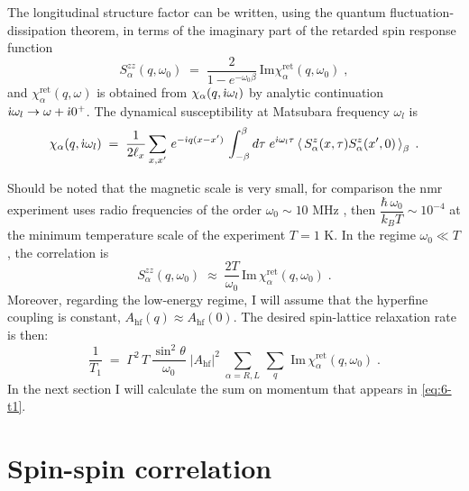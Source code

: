 The longitudinal structure factor can be written, using the quantum fluctuation-dissipation theorem, in terms of the imaginary part of the retarded spin response function 
\begin{equation}
    S^{zz}_{\alpha}(q,\omega_0) \; = \; \frac{2}{1-e^{-\omega_0\beta}} \, \text{Im} \chi^{\text{ret}}_{\alpha}(q,\omega_0) \; ,%
\end{equation}
and $\chi^{\text{ret}}_{\alpha}(q,\omega) $ is obtained from $\chi_{\alpha}(q,\dot{\imath} \omega_l) $ by analytic continuation $\dot{\imath} \omega_l \to \omega + \dot{\imath} 0^{+}$. The dynamical susceptibility at Matsubara frequency $\omega_l$ is
\begin{equation}
    \chi_{\alpha}(q, \dot{\imath} \omega_l ) \; = \;  \frac{1}{2\ell_x}\sum_{x,x'} \, e^{-\dot{\imath} q (x-x')}\, \int_{-\beta }^{\beta}  d\tau \; e^{\dot{\imath} \omega_l \tau  }   \left\langle \,  S_{\alpha}^{z}(x,\tau) S_{\alpha}^{z}(x',0) \,  \right\rangle_{\beta} \; . \label{eq:6-spin-dynamical-susc-momentum}
\end{equation}

Should be noted that the magnetic scale is very small, for comparison the \acrshort{nmr} experiment uses radio frequencies of the order $\omega_{0} \sim 10 \text{ MHz}$ \cite{Baek2017}, then $\dfrac{\hbar \, \omega_0}{k_B T} \sim 10^{-4}$ at the minimum temperature scale of the experiment $T = 1\text{ K}$.   In the regime $\omega_0 \ll T$, the correlation is 
\begin{equation}
    S^{zz}_{\alpha}(q,\omega_0) \;  \approx \;  \frac{2 T}{\omega_0} \, \text{Im} \, \chi^{\text{ret}}_{\alpha}(q,\omega_0) \; .
\end{equation}
Moreover, regarding the low-energy regime, I will assume that the hyperfine coupling is constant, $A_{\text{hf}}(q) \approx A_{\text{hf}}(0)$. The desired spin-lattice relaxation rate is then:
\begin{equation}
    \frac{1}{T_1} \; = \; \Gamma^2 \, T \, \frac{\sin^2 \theta}{\omega_0} \; \vert A_{\text{hf}}\vert^2 \; \sum_{\alpha = R,L} \, \sum_{q} \,  \,  \text{Im} \, \chi^{\text{ret}}_{\alpha}(q,\omega_0) \; . \label{eq:6-t1}
\end{equation}
In the next section I will calculate the sum on momentum that appears in \eqref{eq:6-t1}.

\section{Spin-spin correlation}

